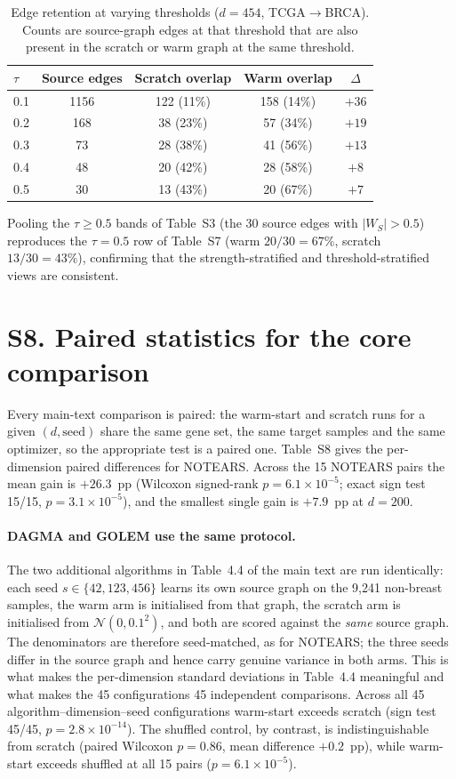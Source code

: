 \documentclass[11pt]{article}
\renewcommand{\to}{\ensuremath{\rightarrow}\allowbreak}
\begin{document}
\setcounter{table}{6}
\begin{table}[h]
\caption{Edge retention at varying thresholds ($d=454$, TCGA$\to$BRCA). Counts are
source-graph edges at that threshold that are also present in the scratch or warm
graph at the same threshold.}
\begin{tabular}{@{}lcccc@{}}
\toprule
$\tau$ & Source edges & Scratch overlap & Warm overlap & $\Delta$\\
\midrule
0.1 & 1156 & 122 (11\%) & 158 (14\%) & $+36$\\
0.2 & 168 & 38 (23\%) & 57 (34\%) & $+19$\\
0.3 & 73 & 28 (38\%) & 41 (56\%) & $+13$\\
0.4 & 48 & 20 (42\%) & 28 (58\%) & $+8$\\
0.5 & 30 & 13 (43\%) & 20 (67\%) & $+7$\\
\bottomrule
\end{tabular}
\label{tab:S7}
\end{table}

Pooling the $\tau\ge0.5$ bands of Table~S3 (the 30 source edges with $|W_S|>0.5$)
reproduces the $\tau=0.5$ row of Table~S7 (warm $20/30=67\%$, scratch
$13/30=43\%$), confirming that the strength-stratified and threshold-stratified
views are consistent.

\section*{S8. Paired statistics for the core comparison}

Every main-text comparison is paired: the warm-start and scratch runs for a given
$(d,\text{seed})$ share the same gene set, the same target samples and the same
optimizer, so the appropriate test is a paired one. Table~S8 gives the per-dimension
paired differences for NOTEARS. Across the 15 NOTEARS pairs the mean gain is $+26.3$~pp
(Wilcoxon signed-rank $p=6.1\times10^{-5}$; exact sign test 15/15, $p=3.1\times10^{-5}$),
and the smallest single gain is $+7.9$~pp at $d=200$.

\paragraph{DAGMA and GOLEM use the same protocol.} The two additional algorithms in
Table~4.4 of the main text are run identically: each seed $s\in\{42,123,456\}$ learns its
own source graph on the 9,241 non-breast samples, the warm arm is initialised from that
graph, the scratch arm is initialised from $\mathcal{N}(0,0.1^2)$, and both are scored
against the \emph{same} source graph. The denominators are therefore seed-matched, as for
NOTEARS; the three seeds differ in the source graph and hence carry genuine variance in
both arms. This is what makes the per-dimension standard deviations in Table~4.4
meaningful and what makes the 45 configurations 45 independent comparisons. Across all 45
algorithm--dimension--seed configurations warm-start exceeds scratch (sign test
45/45, $p=2.8\times10^{-14}$). The shuffled control, by contrast, is indistinguishable
from scratch (paired Wilcoxon $p=0.86$, mean difference $+0.2$~pp), while warm-start
exceeds shuffled at all 15 pairs ($p=6.1\times10^{-5}$).
\end{document}
